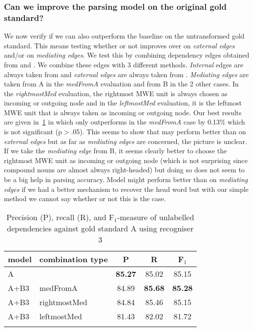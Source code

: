 \documentclass[output=paper]{langsci/langscibook}
\begin{document}
\subsubsection{Can we improve the parsing model on the original gold standard?}
\indent We now verify if we can also outperform the baseline on the untransformed gold standard. This means testing whether or not {\modelB} improves over {\modelA} on \textit{external edges} and/or on \textit{mediating edges}. We test this by combining dependency edges obtained from {\modelA} and {\modelB}. We combine these edges with 3 different methods. \textit{Internal} edges are always taken from {\modelA} and \textit{external edges} are always taken from {\modelB}. \textit{Mediating edges} are taken from A in the \textit{medFromA} evaluation and from B in the 2 other cases. In the \textit{rightmostMed} evaluation, the rightmost MWE unit is always chosen as incoming or outgoing node and in the \textit{leftmostMed} evaluation, it is the leftmost MWE unit that is always taken as incoming or outgoing node. Our best results are given in~\ref{del:tab:res2} in which {\modelB} only outperforms {\modelA} in the \textit{medFromA} case by 0.13\% which is not significant (p$>$.05). This seems to show that {\modelB} may perform better than {\modelA} on \textit{external edges} but as far as \textit{mediating edges} are concerned, the picture is unclear. If we take the \textit{mediating edge} from B, it seems clearly better to choose the rightmost MWE unit as incoming or outgoing node (which is not surprising since compound nouns are almost always right-headed) but doing so does not seem to be a big help in parsing accuracy. Model might perform better than {\modelA} on \textit{mediating edges} if we had a better mechanism to recover the head word but with our simple method we cannot say whether or not this is the case.

\begin{table}[h]
    \centering
    \begin{tabular}{l l c c c} %
      \lsptoprule
        \textnormal{model}
        & \textnormal{combination type}
        & \textnormal{P}
        & \textnormal{R}
        & \textnormal{F$_1$}
        \\ %
        \midrule
        A & & \textbf{85.27} & 85.02 & 85.15\\
        A+B3 & medFromA &84.89  &\textbf{85.68} & \textbf{85.28} \\
        A+B3 & rightmostMed &84.84  &85.46  & 85.15 \\
        A+B3 & leftmostMed &81.43  &82.02  & 81.72 \tabularnewline %
        \lspbottomrule
    \end{tabular}
    \caption{Precision (P), recall (R), and F$_1$-measure of unlabelled dependencies against gold standard A using recogniser 3\label{del:tab:res2}}
\end{table}
\end{document}
